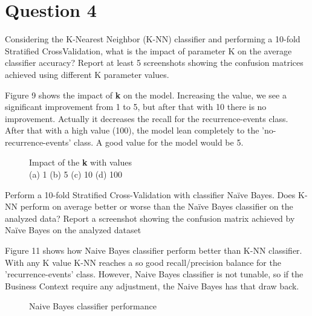 \section{Question 4}

\begin{question}
    Considering the K-Nearest Neighbor (K-NN) classifier and performing a 10-fold Stratified
    CrossValidation, what is the impact of parameter K on the average classifier accuracy? Report at
    least 5 screenshots showing the confusion matrices achieved using different K parameter values.
\end{question}

\begin{answer}
    Figure 9 shows the impact of \textbf{k} on the model. Increasing the value, we see a significant
    improvement from 1 to 5, but after that with 10 there is no improvement. Actually it decreases
    the recall for the recurrence-events class. After that with a high value (100), the model lean
    completely to the 'no-recurrence-events' class. A good value for the model would be 5.

    \begin{figure}
        \centering
        \caption{Impact of the \textbf{k} with values
            \\
            (a) 1 (b) 5 (c) 10 (d) 100}
    \end{figure}
\end{answer}

\begin{question}
    Perform a 10-fold Stratified Cross-Validation with classifier Naïve Bayes. Does K-NN perform on
    average better or worse than the Naïve Bayes classifier on the analyzed data? Report a screenshot
    showing the confusion matrix achieved by Naïve Bayes on the analyzed dataset
\end{question}

\begin{answer}
    Figure 11 shows how Naive Bayes classifier perform better than K-NN classifier. With any K value
    K-NN reaches a so good recall/precision balance for the 'recurrence-events' class. However, Naive Bayes
    classifier is not tunable, so if the Business Context require any adjustment, the Naive Bayes has that
    draw back.
    \begin{figure}
        \centering
        \caption{Naive Bayes classifier performance}
    \end{figure}
\end{answer}
\pagebreak